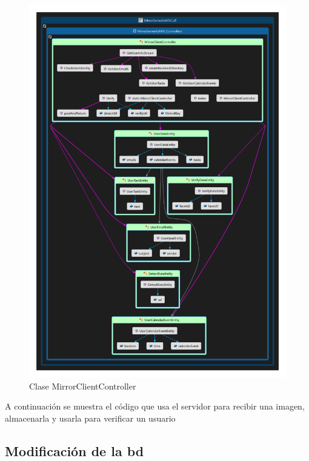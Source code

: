 \begin{figure}[!htbp]
	\centering
	\includegraphics[angle=0, scale=1.0]{fig/MirrorClientController}
	\caption{Clase MirrorClientController}
\end{figure}

\FloatBarrier

A continuación se muestra el código que usa el servidor para recibir una imagen, almacenarla y usarla para verificar un usuario



\subsection{Modificación de la \acrshort{bd}}

